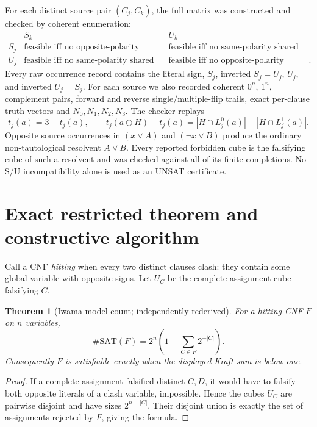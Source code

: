 \documentclass[11pt]{article}
\newtheorem{theorem}{Theorem}
\begin{document}
For each distinct source pair $(C_j,C_k)$, the full matrix was constructed and
checked by coherent enumeration:
\[
\begin{array}{c|cc}
 &S_k&U_k\\\hline
S_j&\text{feasible iff no opposite-polarity shared variable}
    &\text{feasible iff no same-polarity shared variable}\\
U_j&\text{feasible iff no same-polarity shared variable}
    &\text{feasible iff no opposite-polarity shared variable}.
\end{array}
\]
Every raw occurrence record contains the literal sign, $S_j$, inverted $S_j=U_j$,
$U_j$, and inverted $U_j=S_j$.  For each source we also recorded coherent $0^n$,
$1^n$, complement pairs, forward and reverse single/multiple-flip trails, exact
per-clause truth vectors and $N_0,N_1,N_2,N_3$.  The checker replays
\[
t_j(\bar a)=3-t_j(a),\qquad
t_j(a\oplus H)-t_j(a)=|H\cap L_j^0(a)|-|H\cap L_j^1(a)|.
\]
Opposite source occurrences in $(x\vee A)$ and $(\neg x\vee B)$ produce the
ordinary non-tautological resolvent $A\vee B$.  Every reported forbidden cube is
the falsifying cube of such a resolvent and was checked against all of its finite
completions.  No S/U incompatibility alone is used as an UNSAT certificate.

\section{Exact restricted theorem and constructive algorithm}
Call a CNF \emph{hitting} when every two distinct clauses clash: they contain some
global variable with opposite signs.  Let $U_C$ be the complete-assignment cube
falsifying $C$.

\begin{theorem}[Iwama model count; independently rederived]
For a hitting CNF $F$ on $n$ variables,
\[
\#\mathrm{SAT}(F)=2^n\left(1-\sum_{C\in F}2^{-|C|}\right).
\]
Consequently $F$ is satisfiable exactly when the displayed Kraft sum is below one.
\end{theorem}
\begin{proof}
If a complete assignment falsified distinct $C,D$, it would have to falsify both
opposite literals of a clash variable, impossible.  Hence the cubes $U_C$ are
pairwise disjoint and have sizes $2^{n-|C|}$.  Their disjoint union is exactly the
set of assignments rejected by $F$, giving the formula.
\end{proof}
\end{document}
